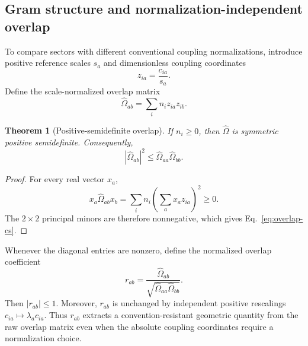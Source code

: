\documentclass[11pt]{article}
\newtheorem{theorem}{Theorem}
\theoremstyle{remark}
\begin{document}
\subsection{Gram structure and normalization-independent overlap}
To compare sectors with different conventional coupling normalizations, introduce positive reference scales $s_a$ and dimensionless coupling coordinates
\begin{equation}
 z_{ia}=\frac{c_{ia}}{s_a}.
\end{equation}
Define the scale-normalized overlap matrix
\begin{equation}
 \widehat\Omega_{ab}=\sum_i n_i z_{ia}z_{ib}.
 \label{eq:normalized-overlap}
\end{equation}

\begin{theorem}[Positive-semidefinite overlap]
If $n_i\ge0$, then $\widehat\Omega$ is symmetric positive semidefinite. Consequently,
\begin{equation}
 |\widehat\Omega_{ab}|^2
 \le \widehat\Omega_{aa}\widehat\Omega_{bb}.
 \label{eq:overlap-cs}
\end{equation}
\end{theorem}

\begin{proof}
For every real vector $x_a$,
\begin{equation}
 x_a\widehat\Omega_{ab}x_b
 =\sum_i n_i\left(\sum_a x_a z_{ia}\right)^2\ge0.
\end{equation}
The $2\times2$ principal minors are therefore nonnegative, which gives Eq.~\eqref{eq:overlap-cs}.
\end{proof}

Whenever the diagonal entries are nonzero, define the normalized overlap coefficient
\begin{equation}
 r_{ab}=\frac{\widehat\Omega_{ab}}
 {\sqrt{\widehat\Omega_{aa}\widehat\Omega_{bb}}}.
 \label{eq:overlap-correlation}
\end{equation}
Then $|r_{ab}|\le1$. Moreover, $r_{ab}$ is unchanged by independent positive rescalings $c_{ia}\mapsto\lambda_a c_{ia}$. Thus $r_{ab}$ extracts a convention-resistant geometric quantity from the raw overlap matrix even when the absolute coupling coordinates require a normalization choice.
\end{document}
